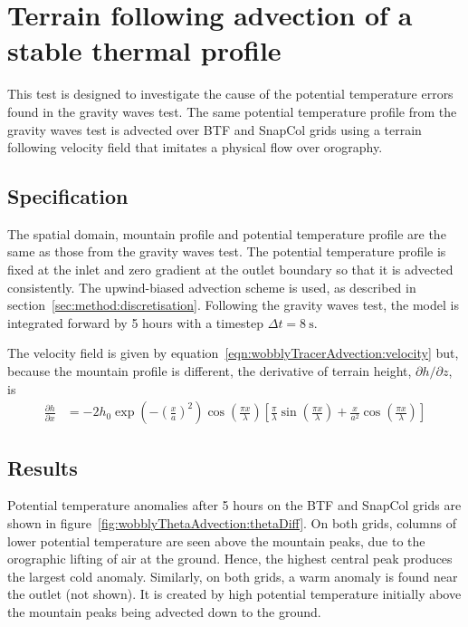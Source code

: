 \section{Terrain following advection of a stable thermal profile}
\label{sec:wobblyThetaAdvection}

This test is designed to investigate the cause of the potential temperature errors found in the gravity waves test.  The same potential temperature profile from the gravity waves test is advected over BTF and SnapCol grids using a terrain following velocity field that imitates a physical flow over orography.

\subsection{Specification}
The spatial domain, mountain profile and potential temperature profile are the same as those from the gravity waves test.  The potential temperature profile is fixed at the inlet and zero gradient at the outlet boundary so that it is advected consistently.  The upwind-biased advection scheme is used, as described in section~\ref{sec:method:discretisation}.  Following the gravity waves test, the model is integrated forward by 5 hours with a timestep $\Delta t = \SI{8}{\second}$. 

The velocity field is given by equation~\ref{eqn:wobblyTracerAdvection:velocity} but, because the mountain profile is different, the derivative of terrain height, $\partial h / \partial z$, is
\begin{align}
\frac{\partial h}{\partial x} &= - 2 h_0 \exp \left( - \left( \frac{x}{a} \right)^2 \right) \cos \left( \frac{\pi x}{\lambda} \right) \left[
\frac{\pi}{\lambda} \sin \left(\frac{\pi x}{\lambda} \right) +
\frac{x}{a^2} \cos \left( \frac{\pi x}{\lambda} \right) \right]
\end{align}


\subsection{Results}

Potential temperature anomalies after 5 hours on the BTF and SnapCol grids are shown in figure~\ref{fig:wobblyThetaAdvection:thetaDiff}.  On both grids, columns of lower potential temperature are seen above the mountain peaks, due to the orographic lifting of air at the ground.  Hence, the highest central peak produces the largest cold anomaly.  Similarly, on both grids, a warm anomaly is found near the outlet (not shown).  It is created by high potential temperature initially above the mountain peaks being advected down to the ground.

